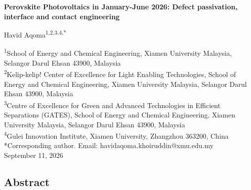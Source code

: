 \documentclass[
  11pt,
]{article}
\author{}
\date{}
\begin{document}
\begin{center}
{\LARGE\bfseries Perovskite Photovoltaics in January-June 2026: Defect passivation, interface and contact engineering\par}
\vspace{1.1em}
{\large Havid Aqoma\textsuperscript{1,2,3,4,*}\par}
\vspace{0.7em}
\begin{minipage}{\textwidth}\centering\small
\textsuperscript{1}School of Energy and Chemical Engineering, Xiamen University Malaysia, Selangor Darul Ehsan 43900, Malaysia\\[0.25em]
\textsuperscript{2}Kelip-kelip! Center of Excellence for Light Enabling Technologies, School of Energy and Chemical Engineering, Xiamen University Malaysia, Selangor Darul Ehsan 43900, Malaysia\\[0.25em]
\textsuperscript{3}Centre of Excellence for Green and Advanced Technologies in Efficient Separations (GATES), School of Energy and Chemical Engineering, Xiamen University Malaysia, Selangor Darul Ehsan 43900, Malaysia\\[0.25em]
\textsuperscript{4}Gulei Innovation Institute, Xiamen University, Zhangzhou 363200, China\\[0.55em]
*Corresponding author. Email: havidaqoma.khoiruddin@xmu.edu.my\\[2.0em]
September 11, 2026
\end{minipage}
\end{center}
\vspace{0.8em}

\subsection{Abstract}\label{abstract}
\end{document}
